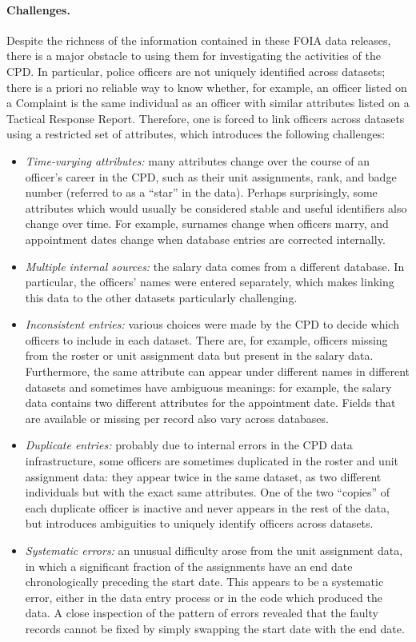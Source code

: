 \paragraph{Challenges.}
Despite the richness of the information contained in these FOIA data releases,
there is a major obstacle to using them for investigating the activities of the
CPD. In particular, police officers are not uniquely identified across datasets; there is
a priori no reliable way to know whether, for example, an officer listed on
a Complaint is the same individual as an officer with similar attributes listed
on a Tactical Response Report. Therefore, one is forced to link officers
across datasets using a restricted set of attributes, 
which introduces the following challenges:
\begin{itemize}
	\item \emph{Time-varying attributes:} many attributes change over the
		course of an officer's career in the CPD, such as their unit
		assignments, rank, and badge number (referred to as a ``star'' in the data). 
                Perhaps surprisingly, some
		attributes which would usually be considered stable and useful
		identifiers also change over time. For example, surnames change when
		officers marry, and appointment dates change when database entries are
		corrected internally.
	\item \emph{Multiple internal sources:} the salary data comes from
		a different database. In particular, the officers' names were entered
		separately, which makes linking this data to the other datasets
		particularly challenging.
	\item \emph{Inconsistent entries:} various choices were made by the CPD to
		decide which officers to include in each dataset.  There are, for
		example, officers missing from the roster or unit assignment data but
		present in the salary data. Furthermore, the same attribute can appear
		under different names in different datasets and sometimes have
		ambiguous meanings: for example, the salary data contains two different
		attributes for the appointment date. Fields that are available or missing
		per record also vary across databases.
	\item \emph{Duplicate entries:} probably due to internal errors in the CPD
		data infrastructure, some officers are sometimes duplicated in the
		roster and unit assignment data: they appear twice in the same dataset,
		as two different individuals but with the exact same attributes. One of
		the two “copies” of each duplicate officer is inactive and never
		appears in the rest of the data, but introduces ambiguities to uniquely
		identify officers across datasets.
	\item \emph{Systematic errors:} an unusual difficulty arose from the unit
		assignment data, in which a significant fraction of the assignments
		have an end date chronologically preceding the start date. This appears
		to be a systematic error, either in the data entry process or in the
		code which produced the data. A close inspection of the pattern of
		errors revealed that the faulty records cannot be fixed by simply
		swapping the start date with the end date.
\end{itemize}

